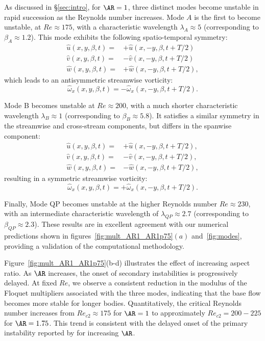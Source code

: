%
As discussed in \S\ref{sec:intro}, for $\AR=1$, three distinct modes become unstable in rapid succession as the Reynolds number increases. Mode $A$ is the first to become unstable, at $Re \approx 175$, with a characteristic wavelength $\lambda_A \approx 5$ (corresponding to $\beta_A \approx 1.2$). This mode exhibits the following spatio-temporal symmetry:
%
\begin{equation}
\begin{aligned}
\hat{u}(x,y,\beta,t) = &+ \hat{u}(x,-y,\beta,t+T/2) \nonumber \\
\hat{v}(x,y,\beta,t) = &-\hat{v}(x,-y,\beta,t+T/2) \nonumber \\
\hat{w}(x,y,\beta,t) = &+ \hat{w}(x,-y,\beta,t+T/2),
\end{aligned}
\end{equation}
%
which leads to an antisymmetric streamwise vorticity:
%
\begin{equation}
\hat{\omega}_x(x,y,\beta,t) = -\hat{\omega}_x(x,-y,\beta,t+T/2).
\end{equation}

Mode B becomes unstable at $Re \approx 200$, with a much shorter characteristic wavelength $\lambda_B \approx 1$ (corresponding to $\beta_B \approx 5.8$). It satisfies a similar symmetry in the streamwise and cross-stream components, but differs in the spanwise component:
%
\begin{equation}
\begin{aligned}
\hat{u}(x,y,\beta,t) = &+\hat{u}(x,-y,\beta,t+T/2), \nonumber \\
\hat{v}(x,y,\beta,t) = &-\hat{v}(x,-y,\beta,t+T/2), \nonumber \\
\hat{w}(x,y,\beta,t) = &-\hat{w}(x,-y,\beta,t+T/2),
\end{aligned}
\end{equation}
%
resulting in a symmetric streamwise vorticity:
%
\begin{equation}
\hat{\omega}_x(x,y,\beta,t) = +\hat{\omega}_x(x,-y,\beta,t+T/2).
\end{equation}

Finally, Mode QP becomes unstable at the higher Reynolds number $Re \approx 230$, with an intermediate characteristic wavelength of $\lambda_{QP} \approx 2.7$ (corresponding to $\beta_{QP} \approx 2.3$).
%
These results are in excellent agreement with our numerical predictions shown in figures~\ref{fig:mult_AR1_AR1p75}$(a)$ and~\ref{fig:modes}, providing a validation of the computational methodology.

Figure~\ref{fig:mult_AR1_AR1p75}(b-d) illustrates the effect of increasing aspect ratio. As $\AR$ increases, the onset of secondary instabilities is progressively delayed. At fixed $Re$, we observe a consistent reduction in the modulus of the Floquet multipliers associated with the three modes, indicating that the base flow becomes more stable for longer bodies. Quantitatively, the critical Reynolds number increases from $Re_{c2} \approx 175$ for $\AR=1$ to approximately $Re_{c2} = 200-225$ for $\AR=1.75$. This trend is consistent with the delayed onset of the primary instability reported by \citet{chiarini-quadrio-auteri-2021} for increasing $\AR$.

